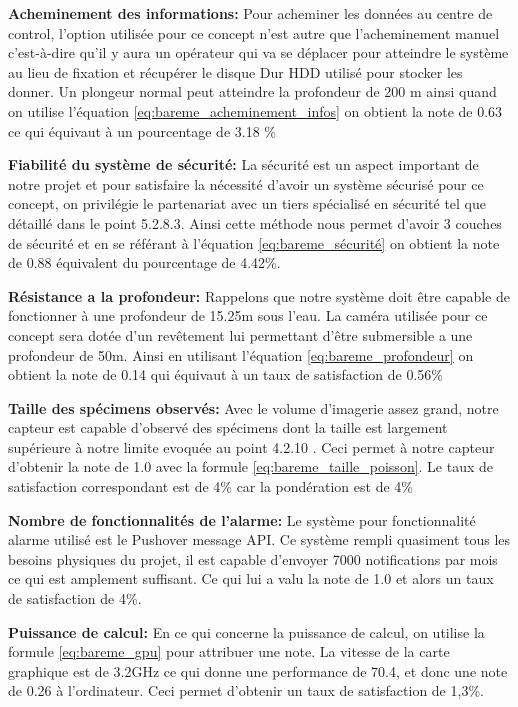  
\textbf{Acheminement des informations:} Pour acheminer les données au centre de control, l’option utilisée pour ce concept n’est autre que l’acheminement manuel c’est-à-dire qu’il y aura un opérateur qui va se déplacer pour atteindre le système au lieu de fixation et récupérer le disque Dur HDD utilisé pour stocker les donner. Un plongeur normal peut atteindre la profondeur de 200 m ainsi quand on utilise l’équation \ref{eq:bareme_acheminement_infos} on obtient la note de 0.63 ce qui équivaut à un pourcentage de 3.18 \%
\vspace{5mm}


\textbf{Fiabilité du système de sécurité:} La sécurité est un aspect important de notre projet et pour satisfaire la nécessité d’avoir un système sécurisé pour ce concept, on privilégie le partenariat avec un tiers spécialisé en sécurité tel que détaillé dans le point 5.2.8.3. Ainsi cette méthode nous permet d’avoir 3  couches de sécurité et en se référant à l’équation \ref{eq:bareme_sécurité} on obtient la note de 0.88 équivalent du pourcentage de 4.42\%.
\vspace{5mm}


\textbf{Résistance a la profondeur:} Rappelons que notre système doit être capable de fonctionner à une profondeur de 15.25m sous l’eau. La caméra utilisée pour ce concept sera dotée d’un revêtement lui permettant d’être submersible a une profondeur de 50m. Ainsi en utilisant l’équation \ref{eq:bareme_profondeur} on obtient la note de 0.14 qui équivaut à un taux de satisfaction de 0.56\%
\vspace{5mm}


\textbf{Taille des spécimens observés:} Avec le volume d’imagerie assez grand, notre capteur est capable d’observé des spécimens dont la taille est largement supérieure à notre limite evoquée au point 4.2.10 . Ceci permet à notre capteur d’obtenir la note de 1.0 avec la formule \ref{eq:bareme_taille_poisson}. Le taux de satisfaction correspondant est de 4\% car la pondération est de 4\%
\vspace{5mm}


\textbf{Nombre de fonctionnalités de l’alarme:} Le système pour fonctionnalité alarme utilisé est le Pushover message API. Ce système rempli quasiment tous les besoins physiques du projet, il est capable d’envoyer 7000 notifications par mois ce qui est amplement suffisant. Ce qui lui a valu la note de 1.0 et alors un taux de satisfaction de 4\%.
\vspace{5mm}


\textbf{Puissance de calcul:} En ce qui concerne la puissance de calcul, on utilise la formule \ref{eq:bareme_gpu} pour attribuer une note. La vitesse de la carte graphique est de 3.2GHz ce qui donne une performance de 70.4, et donc une note de 0.26 à l’ordinateur. Ceci permet d’obtenir un taux de satisfaction de 1,3\%.
\vspace{5mm}


